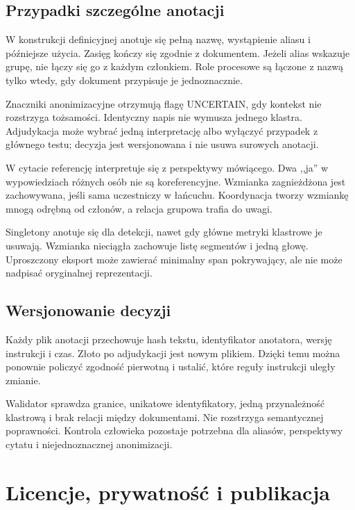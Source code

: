\subsection{Przypadki szczególne anotacji}

W konstrukcji definicyjnej anotuje się pełną nazwę, wystąpienie aliasu i późniejsze użycia. Zasięg kończy się zgodnie z dokumentem. Jeżeli alias wskazuje grupę, nie łączy się go z każdym członkiem. Role procesowe są łączone z nazwą tylko wtedy, gdy dokument przypisuje je jednoznacznie.

Znaczniki anonimizacyjne otrzymują flagę UNCERTAIN, gdy kontekst nie rozstrzyga tożsamości. Identyczny napis nie wymusza jednego klastra. Adjudykacja może wybrać jedną interpretację albo wyłączyć przypadek z głównego testu; decyzja jest wersjonowana i nie usuwa surowych anotacji.

W cytacie referencję interpretuje się z perspektywy mówiącego. Dwa ,,ja'' w wypowiedziach różnych osób nie są koreferencyjne. Wzmianka zagnieżdżona jest zachowywana, jeśli sama uczestniczy w łańcuchu. Koordynacja tworzy wzmiankę mnogą odrębną od członów, a relacja grupowa trafia do uwagi.

Singletony anotuje się dla detekcji, nawet gdy główne metryki klastrowe je usuwają. Wzmianka nieciągła zachowuje listę segmentów i jedną głowę. Uproszczony eksport może zawierać minimalny span pokrywający, ale nie może nadpisać oryginalnej reprezentacji.

\subsection{Wersjonowanie decyzji}

Każdy plik anotacji przechowuje hash tekstu, identyfikator anotatora, wersję instrukcji i czas. Złoto po adjudykacji jest nowym plikiem. Dzięki temu można ponownie policzyć zgodność pierwotną i ustalić, które reguły instrukcji uległy zmianie.

Walidator sprawdza granice, unikatowe identyfikatory, jedną przynależność klastrową i brak relacji między dokumentami. Nie rozstrzyga semantycznej poprawności. Kontrola człowieka pozostaje potrzebna dla aliasów, perspektywy cytatu i niejednoznacznej anonimizacji.

\section{Licencje, prywatność i publikacja}
\label{sec:bezpieczenstwo-danych}

